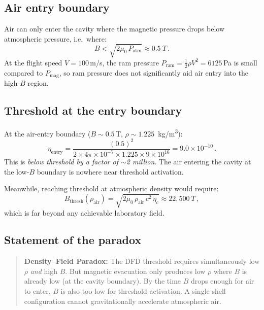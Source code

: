 \documentclass[12pt,twocolumn]{article}
\begin{document}
\subsection{Air entry boundary}

Air can only enter the cavity where the magnetic pressure drops below
atmospheric pressure, i.e.\ where:
\begin{equation}
  B < \sqrt{2\mu_0\,P_\mathrm{atm}} \approx 0.5~\si{T}\,.
  \label{eq:B-entry}
\end{equation}
At the flight speed $V = 100$\,m/s, the ram pressure
$P_\mathrm{ram} = \frac{1}{2}\rho V^2 = 6125$\,Pa is small compared
to $P_\mathrm{mag}$, so ram pressure does not significantly aid air
entry into the high-$B$ region.

\subsection{Threshold at the entry boundary}

At the air-entry boundary ($B \sim 0.5$\,T,
$\rho \sim 1.225$~\si{kg/m^3}):
\begin{equation}
  \eta_\mathrm{entry}
    = \frac{(0.5)^2}{2 \times 4\pi\times10^{-7}
      \times 1.225 \times 9\times10^{16}}
    = 9.0 \times 10^{-10}\,.
\end{equation}
This is \emph{below threshold by a factor of $\sim$2 million}. The air
entering the cavity at the low-$B$ boundary is nowhere near threshold
activation.

Meanwhile, reaching threshold at atmospheric density would require:
\begin{equation}
  B_\mathrm{thresh}(\rho_\mathrm{air})
    = \sqrt{2\mu_0\,\rho_\mathrm{air}\,c^2\,\eta_c}
    \approx 22{,}500~\si{T}\,,
\end{equation}
which is far beyond any achievable laboratory field.

\subsection{Statement of the paradox}

\begin{quote}
\textbf{Density--Field Paradox:} The DFD threshold requires
simultaneously low $\rho$ \emph{and} high $B$. But magnetic evacuation
only produces low $\rho$ where $B$ is already low (at the cavity
boundary). By the time $B$ drops enough for air to enter, $B$ is also
too low for threshold activation. A single-shell configuration cannot
gravitationally accelerate atmospheric air.
\end{quote}
\end{document}
